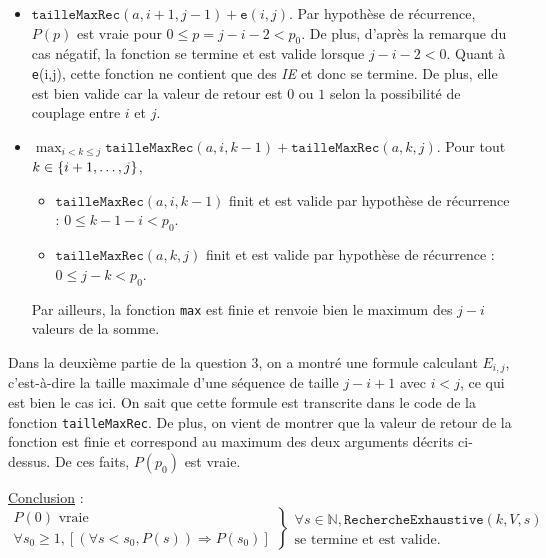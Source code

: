 \documentclass[12pt,a4paper]{article}
\begin{document}
	\begin{itemize}
		\item $\texttt{tailleMaxRec}(a,i+1,j-1) + \texttt{e}(i,j)$. Par hypoth\`ese de r\'ecurrence, $P(p)$ est vraie pour $0 \leq p=j-i-2 < p_0$. De plus, d'apr\`es la remarque du cas n\'egatif, la fonction se termine et est valide lorsque $j-i-2<0$. Quant \`a \texttt{e}(i,j), cette fonction ne contient que des {\itshape IE} et donc se termine. De plus, elle est bien valide car la valeur de retour est $0$ ou $1$ selon la possibilit\'e de couplage entre $i$ et $j$.
		\item $\displaystyle\max_{i < k \leq j} {\texttt{tailleMaxRec}(a,i,k-1)+\texttt{tailleMaxRec}(a,k,j)}$. Pour tout $\\k \in \{i+1, \dotsc, j\}$, 
		\begin{itemize}
			\item $\texttt{tailleMaxRec}(a,i,k-1)$ finit et est valide par hypoth\`ese de r\'ecurrence : $0 \leq k-1-i < p_0$. 
			\item $\texttt{tailleMaxRec}(a,k,j)$ finit et est valide par hypoth\`ese de r\'ecurrence : $0 \leq j-k < p_0$.
		\end{itemize}
		Par ailleurs, la fonction \texttt{max} est finie et renvoie bien le maximum des $j-i$ valeurs de la somme.
	\end{itemize}
	
	Dans la deuxi\`eme partie de la question 3, on a montr\'e une formule calculant $E_{i,j}$, c'est-\`a-dire la taille maximale d'une s\'equence de taille $j-i+1$ avec $i<j$, ce qui est bien le cas ici. On sait que cette formule est transcrite dans le code de la fonction \texttt{tailleMaxRec}. De plus, on vient de montrer que la valeur de retour de la fonction est finie et correspond au maximum des deux arguments d\'ecrits ci-dessus. De ces faits, $P(p_0)$ est vraie.
	
	
\underline{Conclusion} : 
\begin{equation*}
\left .\begin{array}{l}
P(0) \text{ vraie } \\
\forall s_0 \geq 1, [(\forall s < s_0, P(s)) \Rightarrow P(s_0) ]
\end{array} \right \}
\left .\begin{array}{l}
\forall s \in \mathbb{N}, \texttt{RechercheExhaustive}(k,V,s) \\
\text{se termine et est valide.}
\end{array}\right .
\end{equation*}
\end{document}
